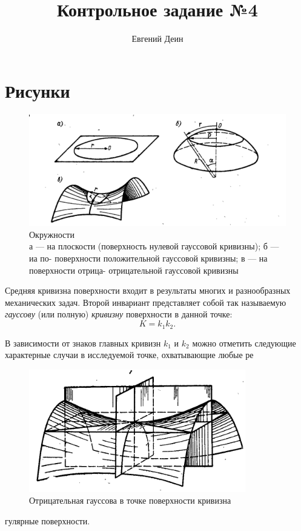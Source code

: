 \documentclass[a4paper,12pt]{article}
\author{Евгений Деин}
\title{Контрольное задание №4}
\begin{document}
	\maketitle
	\section{Рисунки}

	\begin{figure}[h]
        \includegraphics[scale=0.8]{fig_13}
        
        \caption{Окружности \\
        	а — на плоскости (поверхность нулевой гауссовой кривизны); б — иа по-
        	поверхности положительной гауссовой кривизны; в — на поверхности отрица-
        	отрицательной гауссовой кривизны}
        \label{eq:image_13}
	\end{figure}


    Средняя кривизна поверхности входит в результаты многих и разнообразных механических задач.
    Второй инвариант представляет собой так называемую \textit{гауссову} (или полную) \textit{кривизну} поверхности в данной точке:
    \begin{displaymath}
        K=k_1k_2.
    \end{displaymath}
   

    В зависимости от знаков главных кривизн $k_1$ и $k_2$ можно отметить следующие характерные случаи в исследуемой точке, охватывающие любые ре
    \begin{figure}
        \includegraphics[width=\linewidth]{fig_9}
        \caption{Отрицательная гауссова
            в точке поверхности
            кривизна}
        \label{eq:image_9}
    \end{figure} гулярные поверхности. 
\end{document}

